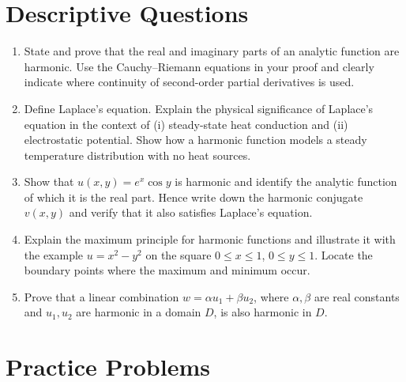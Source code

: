 \documentclass[12pt,a4paper]{article}
\begin{document}
\section{Descriptive Questions}

\begin{enumerate}
  \item State and prove that the real and imaginary parts of an analytic function are harmonic.
  Use the Cauchy--Riemann equations in your proof and clearly indicate where continuity of
  second-order partial derivatives is used.

  \item Define Laplace's equation. Explain the physical significance of Laplace's equation in
  the context of (i) steady-state heat conduction and (ii) electrostatic potential. Show how a
  harmonic function models a steady temperature distribution with no heat sources.

  \item Show that $u(x,y)=e^{x}\cos y$ is harmonic and identify the analytic function of which
  it is the real part. Hence write down the harmonic conjugate $v(x,y)$ and verify that it also
  satisfies Laplace's equation.

  \item Explain the maximum principle for harmonic functions and illustrate it with the example
  $u=x^{2}-y^{2}$ on the square $0\leq x\leq 1$, $0\leq y\leq 1$. Locate the boundary points
  where the maximum and minimum occur.

  \item Prove that a linear combination $w=\alpha u_{1}+\beta u_{2}$, where $\alpha,\beta$ are
  real constants and $u_{1},u_{2}$ are harmonic in a domain $D$, is also harmonic in $D$.
\end{enumerate}

\section{Practice Problems}
\end{document}
